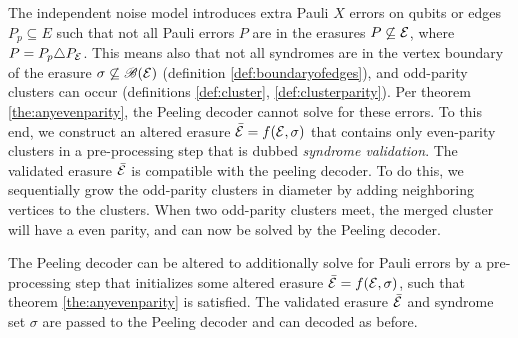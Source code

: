 The independent noise model introduces extra Pauli $X$ errors on qubits or edges $P_p\subseteq E$ such that not all Pauli errors $P$ are in the erasures $P\not\subseteq \mathcal{E}$, where $P = P_p\triangle P_{\mathcal{E}}$. This means also that not all syndromes are in the vertex boundary of the erasure $\sigma \not\subseteq \mathscr{B}(\mathcal{E})$ (definition \ref{def:boundaryofedges}), and odd-parity clusters can occur (definitions \ref{def:cluster}, \ref{def:clusterparity}). Per theorem \ref{the:anyevenparity}, the Peeling decoder cannot solve for these errors. To this end, we construct an altered erasure $\bar{\mathcal{E}} = f(\mathcal{E},\sigma)$ that contains only even-parity clusters in a pre-processing step that is dubbed \emph{syndrome validation}. The validated erasure $\bar{\mathcal{E}}$ is compatible with the peeling decoder. To do this, we sequentially grow the odd-parity clusters in diameter by adding neighboring vertices to the clusters. When two odd-parity clusters meet, the merged cluster will have a even parity, and can now be solved by the Peeling decoder.
\begin{proposition}
  The Peeling decoder can be altered to additionally solve for Pauli errors by a pre-processing step that initializes some altered erasure $\bar{\mathcal{E}}=f(\mathcal{E},\sigma)$, such that theorem \ref{the:anyevenparity} is satisfied. The validated erasure $\bar{\mathcal{E}}$ and syndrome set $\sigma$ are passed to the Peeling decoder and can decoded as before.
\end{proposition}
